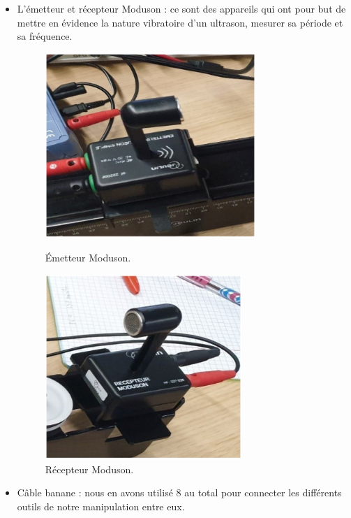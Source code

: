 \documentclass[a4paper]{article}
\begin{document}
\begin{itemize}
  \item L’émetteur et récepteur Moduson : ce sont des appareils qui ont pour but de mettre en évidence la nature vibratoire d’un ultrason, mesurer sa période et sa fréquence.
  \begin{figure}[H]
    \centering
    \begin{minipage}{.5\textwidth}
      \centering
      \includegraphics[height=7cm]{emetteur-moduson1.PNG}
      \caption{Émetteur Moduson.}
      \label{fig:emetteurModuson}
    \end{minipage}%
    \begin{minipage}{.5\textwidth}
      \centering
      \includegraphics[height=7cm]{recepteur-moduson1.PNG}
      \caption{Récepteur Moduson.}
      \label{fig:recepteurModuson}
    \end{minipage}
  \end{figure}
  \item Câble banane : nous en avons utilisé 8 au total pour connecter les différents outils de notre manipulation entre eux.
  \begin{figure}[H]
    \begin{subfigure}{.5\textwidth}

\end{subfigure}
\end{figure}
\end{itemize}
\end{document}
